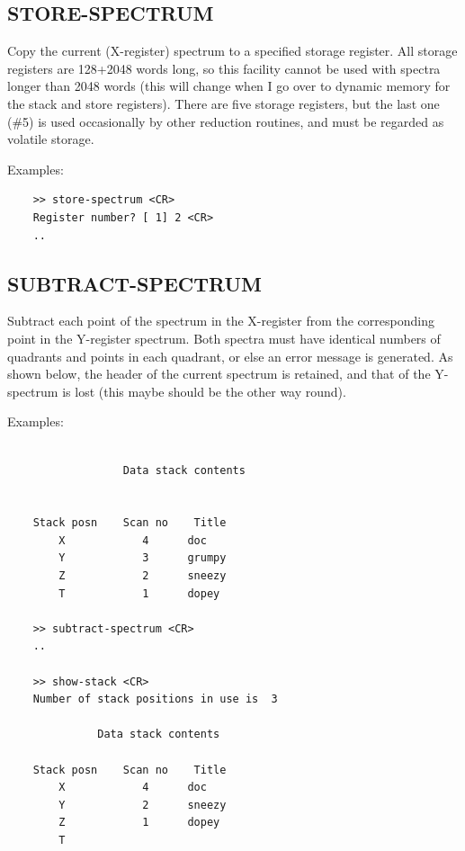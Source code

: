 \documentclass[11pt,twoside]{report}
\begin{document}
\subsection{STORE-SPECTRUM} 


Copy the current (X-register) spectrum to a specified storage register.
All storage registers are 128+2048 words long, so this facility cannot
be used with spectra longer than 2048 words (this will change when I go
over to dynamic memory for the stack and store registers). There are
five storage registers, but the last one (\#5) is used occasionally by
other reduction routines, and must be regarded as volatile storage.

Examples:
\begin{verbatim}
    >> store-spectrum <CR>
    Register number? [ 1] 2 <CR>
    ..
\end{verbatim}

\subsection{SUBTRACT-SPECTRUM} 

Subtract each point of the spectrum in the X-register from the corresponding
point in the Y-register spectrum. Both spectra must have identical numbers
of quadrants and points in each quadrant, or else an error message is
generated. As shown below, the header of the current spectrum is retained,
and that of the Y-spectrum is lost (this maybe should be the other way
round).

Examples:
\begin{verbatim}

                  Data stack contents


    Stack posn    Scan no    Title
        X            4      doc
        Y            3      grumpy
        Z            2      sneezy
        T            1      dopey

    >> subtract-spectrum <CR>
    ..

    >> show-stack <CR>
    Number of stack positions in use is  3

              Data stack contents

    Stack posn    Scan no    Title
        X            4      doc
        Y            2      sneezy
        Z            1      dopey
        T
\end{verbatim}
\end{document}
